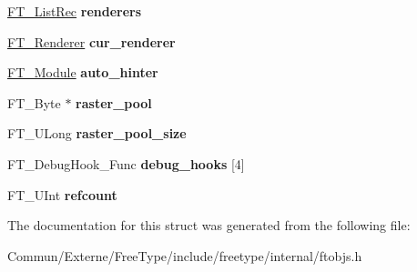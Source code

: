 \begin{DoxyCompactItemize}
\item 
\hyperlink{struct_f_t___list_rec__}{F\+T\+\_\+\+List\+Rec} {\bfseries renderers}\hypertarget{struct_f_t___library_rec___ad9503f71cf4e4d88edfbdda59eb5e43d}{}\label{struct_f_t___library_rec___ad9503f71cf4e4d88edfbdda59eb5e43d}

\item 
\hyperlink{struct_f_t___renderer_rec__}{F\+T\+\_\+\+Renderer} {\bfseries cur\+\_\+renderer}\hypertarget{struct_f_t___library_rec___a528dd3298756070ecad7d0f82f009294}{}\label{struct_f_t___library_rec___a528dd3298756070ecad7d0f82f009294}

\item 
\hyperlink{struct_f_t___module_rec__}{F\+T\+\_\+\+Module} {\bfseries auto\+\_\+hinter}\hypertarget{struct_f_t___library_rec___ae608b33b223905d4d70b782ed7ec8c78}{}\label{struct_f_t___library_rec___ae608b33b223905d4d70b782ed7ec8c78}

\item 
F\+T\+\_\+\+Byte $\ast$ {\bfseries raster\+\_\+pool}\hypertarget{struct_f_t___library_rec___aa8dd799d2efb7817b05c4a02a6828275}{}\label{struct_f_t___library_rec___aa8dd799d2efb7817b05c4a02a6828275}

\item 
F\+T\+\_\+\+U\+Long {\bfseries raster\+\_\+pool\+\_\+size}\hypertarget{struct_f_t___library_rec___a798afdcaf0cda349eb454b769abfa251}{}\label{struct_f_t___library_rec___a798afdcaf0cda349eb454b769abfa251}

\item 
F\+T\+\_\+\+Debug\+Hook\+\_\+\+Func {\bfseries debug\+\_\+hooks} \mbox{[}4\mbox{]}\hypertarget{struct_f_t___library_rec___a1ba1f5abd0254a22dae533a9ac971b84}{}\label{struct_f_t___library_rec___a1ba1f5abd0254a22dae533a9ac971b84}

\item 
F\+T\+\_\+\+U\+Int {\bfseries refcount}\hypertarget{struct_f_t___library_rec___aad71b1ecfaea56594fbd21c18e72f15c}{}\label{struct_f_t___library_rec___aad71b1ecfaea56594fbd21c18e72f15c}

\end{DoxyCompactItemize}


The documentation for this struct was generated from the following file\+:\begin{DoxyCompactItemize}
\item 
Commun/\+Externe/\+Free\+Type/include/freetype/internal/ftobjs.\+h\end{DoxyCompactItemize}
